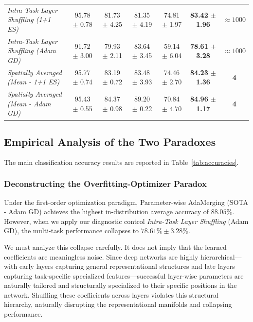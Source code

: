 \begin{table}[t]
\begin{center}
\begin{footnotesize}
\begin{sc}
\begin{tabular}{lcccccc}
\midrule
\emph{Intra-Task Layer Shuffling (1+1 ES)} & 95.78 $\pm$ 0.78 & 81.73 $\pm$ 4.25 & 81.35 $\pm$ 4.19 & 74.81 $\pm$ 1.97 & \textbf{83.42 $\pm$ 1.96} & $\approx 1000$ \\
\emph{Intra-Task Layer Shuffling (Adam GD)} & 91.72 $\pm$ 3.00 & 79.93 $\pm$ 2.11 & 83.64 $\pm$ 3.45 & 59.14 $\pm$ 6.04 & \textbf{78.61 $\pm$ 3.28} & $\approx 1000$ \\
\midrule
\emph{Spatially Averaged (Mean - 1+1 ES)} & 95.77 $\pm$ 0.74 & 83.19 $\pm$ 0.72 & 83.48 $\pm$ 3.93 & 74.46 $\pm$ 2.70 & \textbf{84.23 $\pm$ 1.36} & \textbf{4} \\
\emph{Spatially Averaged (Mean - Adam GD)} & 95.43 $\pm$ 0.55 & 84.37 $\pm$ 0.98 & 89.20 $\pm$ 0.22 & 70.84 $\pm$ 4.70 & \textbf{84.96 $\pm$ 1.17} & \textbf{4} \\
\bottomrule
\end{tabular}
\end{sc}
\end{footnotesize}
\end{center}
\vskip -0.1in
\end{table}

\subsection{Empirical Analysis of the Two Paradoxes}
The main classification accuracy results are reported in Table~\ref{tab:accuracies}.

\subsubsection{Deconstructing the Overfitting-Optimizer Paradox}
\label{sub:overfitting_paradox}
Under the first-order optimization paradigm, Parameter-wise AdaMerging (SOTA - Adam GD) achieves the highest in-distribution average accuracy of $88.05\%$. However, when we apply our diagnostic control \emph{Intra-Task Layer Shuffling} (Adam GD), the multi-task performance collapses to $78.61\% \pm 3.28\%$. 

We must analyze this collapse carefully. It does not imply that the learned coefficients are meaningless noise. Since deep networks are highly hierarchical—with early layers capturing general representational structures and late layers capturing task-specific specialized features—successful layer-wise parameters are naturally tailored and structurally specialized to their specific positions in the network. Shuffling these coefficients across layers violates this structural hierarchy, naturally disrupting the representational manifolds and collapsing performance.

